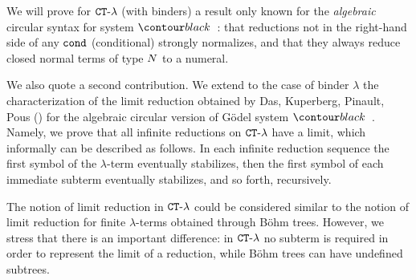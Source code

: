 We will prove for ${ {\tt CT}\mbox{-}\lambda}$ (with binders) a result only
known for the \emph{algebraic} circular syntax for system $\systemT$:
that reductions not in the right-hand side of any ${\tt cond}$ (conditional)
strongly normalizes, and that they always reduce closed normal terms of type 
${N}$ to a numeral.

We also quote a second contribution. We extend to the case of binder $\lambda$ the
characterization of the limit reduction obtained 
by Das, Kuperberg, Pinault, Pous 
(\cite{2021-Anupam-Das,DBLP:conf/fscd/000221,DBLP:conf/lics/Curzi022,DBLP:conf/csl/Curzi023,DBLP:conf/lics/Curzi023})
for the algebraic circular version of 
G\"{o}del system $\systemT$. Namely, we prove that all infinite reductions on ${ {\tt CT}\mbox{-}\lambda}$
have a limit, which informally can be described as follows. 
In each infinite reduction sequence
the first symbol of the $\lambda$-term eventually stabilizes, then the
first symbol of each immediate subterm eventually stabilizes, and so forth, recursively.

The notion of limit reduction in ${ {\tt CT}\mbox{-}\lambda}$
could be considered similar to the notion of limit reduction for finite $\lambda$-terms obtained
through B\"{o}hm trees. 
However, we stress that there is an important difference: 
in ${ {\tt CT}\mbox{-}\lambda}$ no  subterm is required
in order to represent the limit of a reduction, while B\"{o}hm trees 
can have undefined subtrees. 




